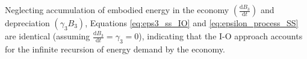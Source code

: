 Neglecting accumulation of embodied energy in the economy $\left(\frac{\mathrm{d}B_{3}}{\mathrm{d}t}\right)$ and depreciation $\left(\gamma_{3}B_{3}\right)$, Equations \ref{eq:eps3_ss_IO} and \ref{eq:epsilon_process_SS} are identical (assuming $\frac{\mathrm{d}B_{3}}{\mathrm{d}t} =\gamma_{3} = 0$), indicating that the I-O approach accounts for the infinite recursion of energy demand by the economy.










%
%


